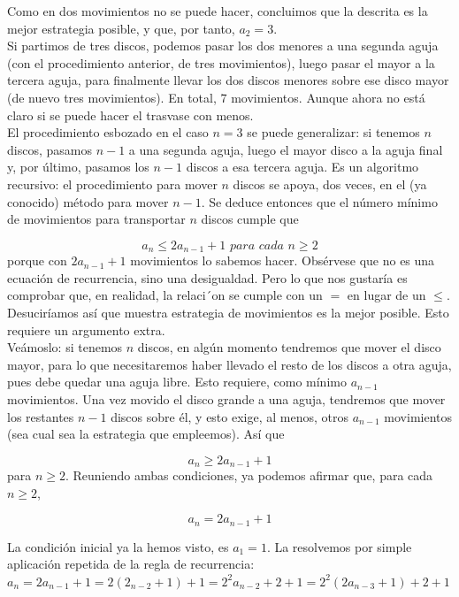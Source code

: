 \documentclass{article}
\begin{document}
Como en dos movimientos no se puede hacer, concluimos que la descrita es la mejor estrategia posible, y que, por tanto, $a_2 = 3$.\\

Si partimos de tres discos, podemos pasar los dos menores a una segunda aguja (con el procedimiento anterior, de tres movimientos), luego pasar el mayor a la tercera aguja, para finalmente llevar los dos discos menores sobre ese disco mayor (de nuevo tres movimientos). En total, 7 movimientos. Aunque ahora no está claro si se puede hacer el trasvase con menos.\\

El procedimiento esbozado en el caso $n=3$ se puede generalizar: si tenemos $n$ discos, pasamos $n-1$ a una segunda aguja, luego el mayor disco a la aguja final y, por último, pasamos los $n-1$ discos a esa tercera aguja. Es un algoritmo recursivo: el procedimiento para mover $n$ discos se apoya, dos veces, en el (ya conocido) método para mover $n-1$. Se deduce entonces que el número mínimo de movimientos para transportar $n$ discos cumple que

$$a_n \leq 2a_{n-1} + 1 \textit{   para cada } n \geq 2 $$
porque con $2a_{n-1} + 1$ movimientos lo sabemos hacer. Obsérvese que no es una ecuación de recurrencia, sino una desigualdad. Pero lo que nos gustaría es comprobar que, en realidad, la
relaci´on se cumple con un $=$ en lugar de un $\leq$. Desuciríamos así que muestra estrategia de movimientos es la mejor posible. Esto requiere un argumento extra.\\

Veámoslo: si tenemos $n$ discos, en algún momento tendremos que mover el disco mayor, para lo que necesitaremos haber llevado el resto de los discos a otra aguja, pues debe quedar una aguja libre. Esto requiere, como mínimo $a_{n-1}$ movimientos. Una vez movido el disco grande a una aguja, tendremos que mover los restantes $n-1$ discos sobre él, y esto exige, al menos, otros $a_{n-1}$ movimientos (sea cual sea la estrategia que empleemos). Así que 

$$a_n \geq 2a_{n-1} + 1$$
para $n \geq 2$. Reuniendo ambas condiciones, ya podemos afirmar que, para cada $n \geq 2$,

$$a_n = 2a_{n-1} + 1$$

La condición inicial ya la hemos visto, es $a_1 = 1$. La resolvemos por simple aplicación repetida de la regla de recurrencia:\\

$a_n = 2 a_{n-1} + 1 = 2(2_{n-2} + 1) +1 = 2^2 a_{n-2} +2 +1 = 2^2(2a_{n-3}+1) +2+1$
\end{document}
